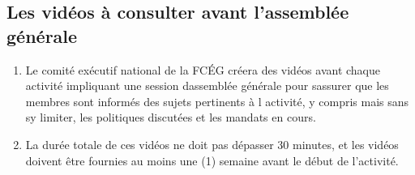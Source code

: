 \subsection{Les vidéos à consulter avant l'assemblée générale}
\label{les-videos-a-consulter-avant-l-assemblee-generale}

\begin{enumerate}
 \item
  Le comité exécutif national de la FCÉG créera des vidéos avant chaque activité impliquant une session d\textquotesingle assemblée générale pour s\textquotesingle assurer que les membres sont informés des sujets pertinents à l\textquotesingle{} activité, y compris mais sans s\textquotesingle y limiter, les politiques discutées et les mandats en cours.
 \item
  La durée totale de ces vidéos ne doit pas dépasser 30 minutes, et les vidéos doivent être fournies au moins une (1) semaine avant le début de l'activité.
\end{enumerate}


